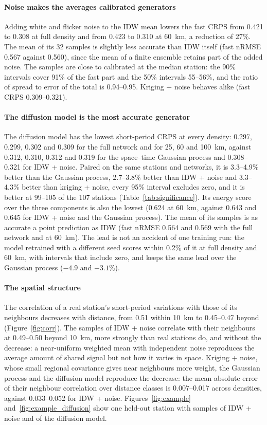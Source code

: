 \documentclass[preprint,12pt,authoryear]{elsarticle}
\begin{document}
\paragraph{Noise makes the averages calibrated generators} Adding white and flicker noise
to the IDW mean lowers the fast CRPS from 0.421 to 0.308 at full density and from 0.423
to 0.310 at 60~km, a reduction of 27\%. The mean of its 32 samples is slightly less
accurate than IDW itself (fast nRMSE 0.567 against 0.560), since the mean of a finite
ensemble retains part of the added noise. The samples are close to calibrated at the
median station: the 90\% intervals cover 91\% of the fast part and the 50\% intervals
55--56\%, and the ratio of spread to error of the total is 0.94--0.95. Kriging + noise
behaves alike (fast CRPS 0.309--0.321).

\paragraph{The diffusion model is the most accurate generator} The diffusion model has
the lowest short-period CRPS at every density: 0.297, 0.299, 0.302 and 0.309 for the full
network and for 25, 60 and 100~km, against 0.312, 0.310, 0.312 and 0.319 for the
space--time Gaussian process and 0.308--0.321 for IDW + noise. Paired on the same
stations and networks, it is 3.3--4.9\% better than the Gaussian process, 2.7--3.8\%
better than IDW + noise and 3.3--4.3\% better than kriging + noise, every 95\% interval
excludes zero, and it is better at 99--105 of the 107 stations
(Table~\ref{tab:significance}). Its energy score over the three components is also the
lowest (0.624 at 60~km, against 0.643 and 0.645 for IDW + noise and the Gaussian
process). The mean of its samples is as accurate a point prediction as IDW (fast nRMSE
0.564 and 0.569 with the full network and at 60~km). The lead is not an accident of one
training run: the model retrained with a different seed scores within 0.2\% of it at full
density and 60~km, with intervals that include zero, and keeps the same lead over the
Gaussian process ($-4.9$ and $-3.1\%$).

\paragraph{The spatial structure} The correlation of a real station's short-period
variations with those of its neighbours decreases with distance, from 0.51 within 10~km
to 0.45--0.47 beyond (Figure~\ref{fig:corr}). The samples of IDW + noise correlate with
their neighbours at 0.49--0.50 beyond 10~km, more strongly than real stations do, and
without the decrease: a near-uniform weighted mean with independent noise reproduces the
average amount of shared signal but not how it varies in space. Kriging + noise, whose
small regional covariance gives near neighbours more weight, the Gaussian process and the
diffusion model reproduce the decrease: the mean absolute error of their neighbour
correlation over distance classes is 0.007--0.017 across densities, against 0.033--0.052
for IDW + noise. Figures~\ref{fig:example} and~\ref{fig:example_diffusion} show one
held-out station with samples of IDW + noise and of the diffusion model.
\end{document}
